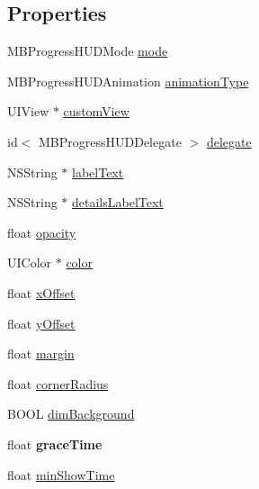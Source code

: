 \subsection*{Properties}
\begin{DoxyCompactItemize}
\item 
M\+B\+Progress\+H\+U\+D\+Mode \mbox{\hyperlink{interface_m_b_progress_h_u_d_ace77eaaf507e86fe56436f7ee7b6fdc9}{mode}}
\item 
M\+B\+Progress\+H\+U\+D\+Animation \mbox{\hyperlink{interface_m_b_progress_h_u_d_a71d04bb9e2839df9377ad10d03b2e468}{animation\+Type}}
\item 
U\+I\+View $\ast$ \mbox{\hyperlink{interface_m_b_progress_h_u_d_a9e150217d3d824f16ae10bafbcc6232e}{custom\+View}}
\item 
id$<$ M\+B\+Progress\+H\+U\+D\+Delegate $>$ \mbox{\hyperlink{interface_m_b_progress_h_u_d_a81a508c2375e4e97d5450bc3898ff7d9}{delegate}}
\item 
N\+S\+String $\ast$ \mbox{\hyperlink{interface_m_b_progress_h_u_d_ae43d72850b8dd657db1b383be0566093}{label\+Text}}
\item 
N\+S\+String $\ast$ \mbox{\hyperlink{interface_m_b_progress_h_u_d_ab5ad528a731e513b39e3183129af1f37}{details\+Label\+Text}}
\item 
float \mbox{\hyperlink{interface_m_b_progress_h_u_d_a24ab5e37917e3489d6add081324a49ff}{opacity}}
\item 
U\+I\+Color $\ast$ \mbox{\hyperlink{interface_m_b_progress_h_u_d_adcd50b7dff312bb10e69588f40325f0f}{color}}
\item 
float \mbox{\hyperlink{interface_m_b_progress_h_u_d_a4e6ee114c04b90ced1a253a6d33ba785}{x\+Offset}}
\item 
float \mbox{\hyperlink{interface_m_b_progress_h_u_d_ad526ffcabab5131697eb0850c50ab1f4}{y\+Offset}}
\item 
float \mbox{\hyperlink{interface_m_b_progress_h_u_d_a4126e72234f8afcb87905a9ed65c022c}{margin}}
\item 
float \mbox{\hyperlink{interface_m_b_progress_h_u_d_a8a3573dbf4dcdeeb187a08d0070e811c}{corner\+Radius}}
\item 
B\+O\+OL \mbox{\hyperlink{interface_m_b_progress_h_u_d_ab781ccd4428c8eff6907d2cdc90fc3ee}{dim\+Background}}
\item 
\mbox{\label{interface_m_b_progress_h_u_d_a6f837c351a405d0bb6ec05856d7776dd}} 
float {\bfseries grace\+Time}
\item 
float \mbox{\hyperlink{interface_m_b_progress_h_u_d_a9946e4b0b16d75f070ff0cbcc50226ef}{min\+Show\+Time}}

\end{DoxyCompactItemize}
